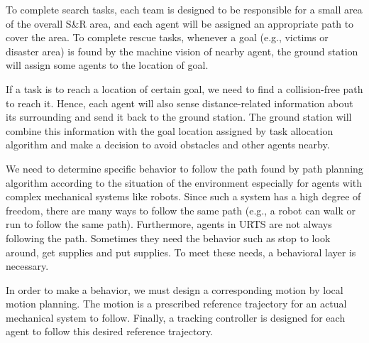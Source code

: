 \documentclass{ieeeaccess}
\begin{document}
To complete search tasks, each team is designed to be responsible for a small area of the overall S\&R area, and each agent will be assigned an appropriate path to cover the area. To complete rescue tasks, whenever a goal (e.g., victims or disaster area) is found by the machine vision of nearby agent, the ground station will assign some agents to the location of goal. 

If a task is to reach a location of certain goal, we need to find a collision-free path to reach it. 
Hence, each agent will also sense distance-related information about its surrounding and send it back to the ground station. The ground station will combine this information with the goal location assigned by task allocation algorithm and make a decision to avoid obstacles and other agents nearby.

We need to determine specific behavior to follow the path found by path planning algorithm according to the situation of the environment especially for agents with complex mechanical systems like robots. Since such a system has a high degree of freedom, there are many ways to follow the same path (e.g., a robot can walk or run to follow the same path). Furthermore, agents in URTS are not always following the path. Sometimes they need the behavior such as stop to look around, get supplies and put supplies. To meet these needs, a behavioral layer is necessary.

In order to make a behavior, we must design a corresponding motion by local motion planning. The motion is a prescribed reference trajectory for an actual mechanical system to follow. Finally, a tracking controller is designed for each agent to follow this desired reference trajectory.
\end{document}
